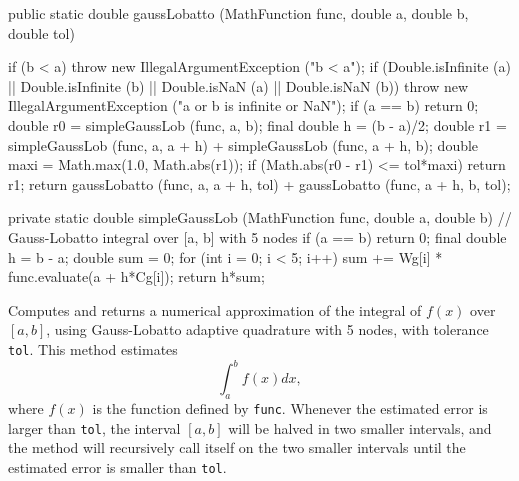 \begin{code}

   public static double gaussLobatto (MathFunction func, double a, double b,
                                      double tol)\begin{hide} {
      if (b < a)
         throw new IllegalArgumentException ("b < a");
      if (Double.isInfinite (a) || Double.isInfinite (b) ||
          Double.isNaN (a) || Double.isNaN (b))
         throw new IllegalArgumentException ("a or b is infinite or NaN");
      if (a == b)
         return 0;
      double r0 = simpleGaussLob (func, a, b);
      final double h = (b - a)/2;
      double r1 = simpleGaussLob (func, a, a + h) +
                  simpleGaussLob (func, a + h, b);
      double maxi = Math.max(1.0, Math.abs(r1));
      if (Math.abs(r0 - r1) <= tol*maxi)
         return r1;
      return gaussLobatto (func, a, a + h, tol) +
             gaussLobatto (func, a + h, b, tol);
   }


   private static double simpleGaussLob (MathFunction func, double a, double b) {
      // Gauss-Lobatto integral over [a, b] with 5 nodes
      if (a == b)
         return 0;
      final double h = b - a;
      double sum = 0;
      for (int i = 0; i < 5; i++) {
         sum += Wg[i] * func.evaluate(a + h*Cg[i]);
      }
      return h*sum;
   }\end{hide}
\end{code}
\begin{tabb}
 Computes and returns a numerical approximation of the integral of
  $f(x)$ over $[a, b]$, using Gauss-Lobatto adaptive quadrature with
   5 nodes, with tolerance \texttt{tol}. This method estimates
\[
\int_a^b f(x)dx,
\]
 where $f(x)$ is the function defined by \texttt{func}.
Whenever the estimated error is larger than \texttt{tol}, the interval
$[a, b]$ will be halved in two smaller intervals, and  the method will
 recursively call itself on the two smaller intervals until the estimated
 error is smaller than \texttt{tol}.
\end{tabb}
\begin{htmlonly}
\end{htmlonly}
